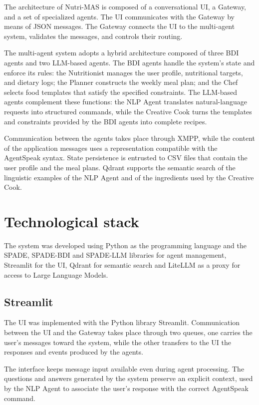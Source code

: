 \documentclass[12pt,a4paper]{article}
\begin{document}
The architecture of Nutri-MAS is composed of a conversational UI, a Gateway, and a set of specialized agents.
The UI communicates with the Gateway by means of JSON messages. The Gateway connects the UI to the multi-agent system, 
validates the messages, and controls their routing.

The multi-agent system adopts a hybrid architecture composed of three BDI agents and two LLM-based agents. 
The BDI agents handle the system’s state and enforce its rules: the Nutritionist manages the user profile, 
nutritional targets, and dietary logs; the Planner constructs the weekly meal plan; and the Chef selects 
food templates that satisfy the specified constraints. The LLM-based agents complement these functions: 
the NLP Agent translates natural-language requests into structured commands, while the Creative Cook turns 
the templates and constraints provided by the BDI agents into complete recipes.

Communication between the agents takes place through XMPP, while the content of the application messages uses a representation
compatible with the AgentSpeak syntax. State persistence is entrusted to CSV files that contain the user profile and the meal plans. Qdrant supports the semantic search of the linguistic examples of the NLP Agent and
of the ingredients used by the Creative Cook.

\section{Technological stack}

The system was developed using Python as the programming language and the SPADE, SPADE-BDI and SPADE-LLM libraries for agent management, 
Streamlit for the UI, Qdrant for semantic search and LiteLLM as a proxy for access to Large Language Models.

\subsection{Streamlit}

The UI was implemented with the Python library Streamlit. Communication between the UI
and the Gateway takes place through two queues, one carries the user's
messages toward the system, while the other transfers to the UI the responses
and events produced by the agents.

The interface keeps message input available even during
agent processing. The questions and answers generated by the system preserve an
explicit context, used by the NLP Agent to associate the user's response
with the correct AgentSpeak command.
\end{document}
